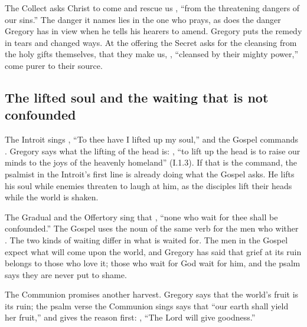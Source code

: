 The Collect asks Christ to come and rescue us , ``from the threatening dangers of our sins.''
The danger it names lies in the one who prays, as does the danger Gregory has
in view when he tells his hearers to amend. Gregory puts the remedy in tears
and changed ways. At the offering the Secret asks for the cleansing from the
holy gifts themselves, that they make us, ,
``cleansed by their mighty power,'' come purer to their source.

\subsection{The lifted soul and the waiting that is not confounded}

The Introit sings , ``To thee have I lifted up
my soul,'' and the Gospel commands . Gregory says
what the lifting of the head is: , ``to lift up the head is to raise our
minds to the joys of the heavenly homeland'' (I.1.3). If that is the command,
the psalmist in the Introit's first line is already doing what the Gospel
asks. He lifts his soul while enemies threaten to laugh at him, as the
disciples lift their heads while the world is shaken.

The Gradual and the Offertory sing that , ``none who wait for thee shall be confounded.'' The Gospel
uses the noun of the same verb for the men who wither . The two kinds of waiting differ in what is waited for. The men
in the Gospel expect what will come upon the world, and Gregory has said that
grief at its ruin belongs to those who love it; those who wait for God wait
for him, and the psalm says they are never put to shame.

The Communion promises another harvest. Gregory says that the world's fruit is
its ruin; the psalm verse the Communion sings says that ``our earth shall yield
her fruit,'' and gives the reason first: ,
``The Lord will give goodness.''

